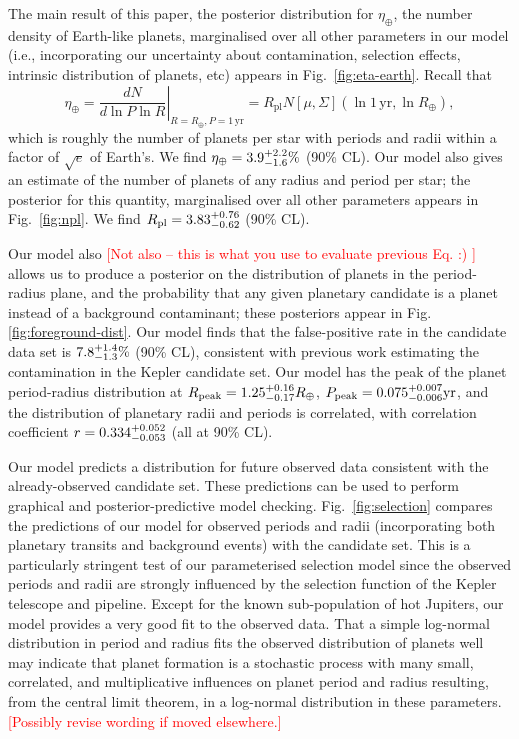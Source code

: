 \documentclass{nature}
\newcommand{\etaearth}{\eta_\oplus}
\newcommand{\Rpeak}{R_\mathrm{peak}}
\newcommand{\REarth}{R_\oplus}
\newcommand{\Rpl}{R_\mathrm{pl}}
\newcommand{\ilya}[1]{\textcolor{red}{#1}}
\begin{document}
The main result of this paper, the posterior distribution for
$\etaearth$, the number density of Earth-like planets, marginalised
over all other parameters in our model (i.e., incorporating our
uncertainty about contamination, selection effects, intrinsic
distribution of planets, etc) appears in Fig.\ \ref{fig:eta-earth}.
Recall that
\begin{equation}
  \etaearth = \left. \frac{dN}{d \ln P \ln R} \right|_{R = \REarth, P
    = 1\,\mathrm{yr}} = \Rpl N\left[ \mu, \Sigma \right]\left( \ln 1\,\mathrm{yr},
  \ln \REarth \right),
\end{equation}
which is roughly the number of planets per star with periods and radii
within a factor of $\sqrt{e}$ of Earth's.  We find $\etaearth =
\earange$ (90\% CL).  Our model also gives an estimate of the number
of planets of any radius and period per star; the posterior for this
quantity, marginalised over all other parameters appears in
Fig.\ \ref{fig:npl}.  We find $\Rpl = \rplrange$ (90\% CL).

Our model also \ilya{[Not also -- this is what you use to evaluate previous Eq. :) ]} allows us to produce a posterior on the distribution of
planets in the period-radius plane, and the probability that any given planetary candidate is a planet
instead of a background contaminant; these posteriors appear in
Fig. \ref{fig:foreground-dist}.  Our model finds that the
false-positive rate in the candidate data set is $7.8_{-1.3}^{+1.4}\%$ (90\%
CL), consistent with previous work\cite{Fressin2013} estimating the
contamination in the Kepler candidate set.  Our model has the peak of
the planet period-radius distribution at $\Rpeak = \rpeakrange
\REarth$, $P_\mathrm{peak} = 0.075_{-0.006}^{+0.007} \mathrm{yr}$, and the
distribution of planetary radii and periods is correlated, with
correlation coefficient $r = 0.334_{-0.053}^{+0.052}$ (all at 90\% CL).

Our model predicts a distribution for future observed data consistent
with the already-observed candidate set.  These predictions can be
used to perform graphical and posterior-predictive model
checking\cite{Gelman2013}.  Fig.\ \ref{fig:selection} compares the
predictions of our model for observed periods and radii (incorporating
both planetary transits and background events) with the candidate set.
This is a particularly stringent test of our parameterised selection
model since the observed periods and radii are strongly influenced by
the selection function of the Kepler telescope and pipeline.  Except
for the known sub-population of hot
Jupiters\cite{Albrecht2012,Naoz2012}, our model provides a very good
fit to the observed data.  That a simple log-normal distribution in
period and radius fits the observed distribution of planets well may
indicate that planet formation is a stochastic process with many
small, correlated, and multiplicative influences on planet period and
radius resulting, from the central limit theorem, in a log-normal
distribution in these parameters. \ilya{[Possibly revise wording if moved elsewhere.]}
\end{document}
